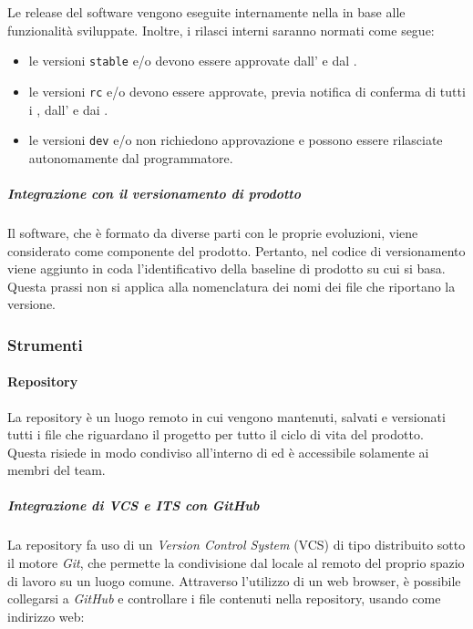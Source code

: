 		Le release del software vengono eseguite internamente nella  in base alle funzionalità sviluppate. Inoltre, i rilasci interni saranno normati come segue:
		\begin{itemize}
			\item le versioni \verb!stable! e/o  devono essere approvate dall' e dal .
			\item le versioni \verb!rc! e/o  devono essere approvate, previa notifica di conferma di tutti i , dall' e dai .
			\item le versioni \verb!dev! e/o  non richiedono approvazione e possono essere rilasciate autonomamente dal programmatore.
		\end{itemize}

		\subparagraph{Integrazione con il versionamento di prodotto}

		Il software, che è formato da diverse parti con le proprie evoluzioni, viene considerato come componente del prodotto. Pertanto, nel codice di versionamento viene aggiunto in coda l'identificativo della baseline di prodotto su cui si basa. Questa prassi non si applica alla nomenclatura dei nomi dei file che riportano la versione.


\subsubsection{Strumenti}

	\paragraph{Repository}

	La repository è un luogo remoto in cui vengono mantenuti, salvati e versionati tutti i file che riguardano il progetto per tutto il ciclo di vita del prodotto. Questa risiede in modo condiviso all'interno di  ed è accessibile solamente ai membri del team.

		\subparagraph{Integrazione di VCS e ITS con GitHub}

		La repository fa uso di un \textit{Version Control System} (VCS) di tipo distribuito sotto il motore \textit{Git}, che permette la condivisione dal locale al remoto del proprio spazio di lavoro su un luogo comune. Attraverso l'utilizzo di un web browser, è possibile collegarsi a \textit{GitHub} e controllare i file contenuti nella repository, usando come indirizzo web:

